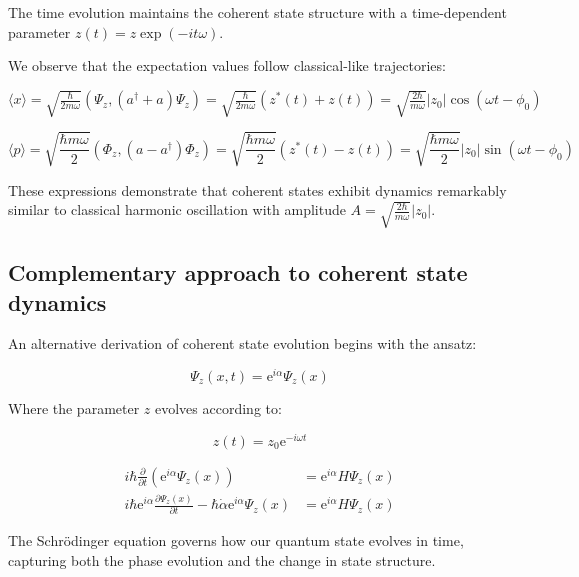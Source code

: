 \documentclass[italian]{HKNdocument}
\begin{document}
The time evolution maintains the coherent state structure with a time-dependent parameter $z(t)=z \exp (-i t \omega)$.

We observe that the expectation values follow classical-like trajectories:

$\langle x\rangle=\sqrt{\frac{\hbar}{2 m \omega}}\left(\Psi_{z},\left(a^{\dagger}+a\right) \Psi_{z}\right)=\sqrt{\frac{\hbar}{2 m \omega}}\left(z^{*}(t)+z(t)\right)=\sqrt{\frac{2 \hbar}{m \omega}}\left|z_{0}\right| \cos \left(\omega t-\phi_{0}\right)$

\begin{equation}
\langle p\rangle=\sqrt{\frac{\hbar m \omega}{2}}\left(\Phi_{z},\left(a-a^{\dagger}\right) \Phi_{z}\right)=\sqrt{\frac{\hbar m \omega}{2}}\left(z^{*}(t)-z(t)\right)=\sqrt{\frac{\hbar m \omega}{2}}\left|z_{0}\right| \sin \left(\omega t-\phi_{0}\right) \label{eq:7.90}
\end{equation}

These expressions demonstrate that coherent states exhibit dynamics remarkably similar to classical harmonic oscillation with amplitude $A=\sqrt{\frac{2 \hbar}{m \omega}}\left|z_{0}\right|$.

\subsection{Complementary approach to coherent state dynamics}
An alternative derivation of coherent state evolution begins with the ansatz:

\begin{equation}
\Psi_{z}(x, t)=\mathrm{e}^{i \alpha} \Psi_{z}(x) \label{eq:7.91}
\end{equation}

Where the parameter $z$ evolves according to:

\begin{equation}
z(t)=z_{0} \mathrm{e}^{-i \omega t} \label{eq:7.92}
\end{equation}

\begin{align}
i \hbar \frac{\partial}{\partial t}\left(\mathrm{e}^{i \alpha} \Psi_{z}(x)\right) & =\mathrm{e}^{i \alpha} H \Psi_{z}(x) \\
i \hbar \mathrm{e}^{i \alpha} \frac{\partial \Psi_{z}(x)}{\partial t}-\hbar \dot{\alpha} \mathrm{e}^{i \alpha} \Psi_{z}(x) & =\mathrm{e}^{i \alpha} H \Psi_{z}(x) \label{eq:7.93}
\end{align}

The Schrödinger equation governs how our quantum state evolves in time, capturing both the phase evolution and the change in state structure.
\end{document}
